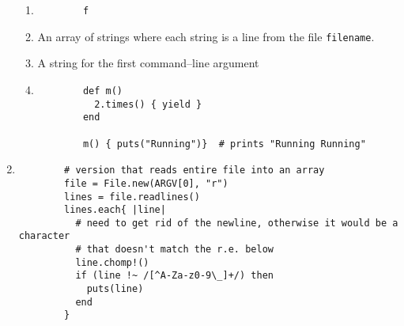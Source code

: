 \documentclass[11pt]{article}
\begin{document}
\begin{enumerate}
\begin{enumerate}
            \item \begin{Verbatim}
        f
                  \end{Verbatim}

            \item An array of strings where each string is a line from the
                  file \texttt{filename}.

            \item A string for the first command--line argument

            \item \begin{Verbatim}
        def m()
          2.times() { yield }
        end

        m() { puts("Running")}  # prints "Running Running"
                  \end{Verbatim}

          \end{enumerate}

    \item \begin{Verbatim}
        # version that reads entire file into an array
        file = File.new(ARGV[0], "r")
        lines = file.readlines()
        lines.each{ |line|
          # need to get rid of the newline, otherwise it would be a character
          # that doesn't match the r.e. below
          line.chomp!()
          if (line !~ /[^A-Za-z0-9\_]+/) then
            puts(line)
          end
        }
                  \end{Verbatim}

  \end{enumerate}
\end{document}

